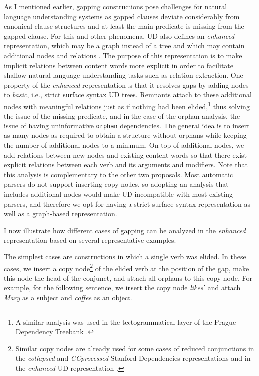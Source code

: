 \documentclass[lucida,biblatex]{sp} %
\begin{document}
As I mentioned earlier, gapping constructions pose challenges for natural language understanding systems as gapped clauses deviate considerably from canonical clause structures and at least the main predicate is missing from the gapped clause. For this and other phenomena, UD also defines an \textit{enhanced} representation, which may be a graph instead of a tree and which may contain additional 
nodes and relations \citep{Nivre2016,Schuster2016}. The purpose of this representation is to
 make implicit relations between content words more explicit in order to facilitate shallow natural language 
 understanding tasks such as relation extraction. One property of the \textit{enhanced} representation 
 is that it resolves gaps by adding nodes to \textit{basic}, i.e., strict surface syntax UD trees. Remnants attach to these additional
 nodes with meaningful relations just as if nothing had been elided,\footnote{A similar analysis was used in the tectogrammatical layer of the Prague Dependency Treebank \citep{PDT2013}.} thus solving the issue of the missing predicate, and in the case of the {\sc orphan} analysis, the issue of having uninformative \texttt{orphan} dependencies. The general idea is to insert 
 as many nodes as required to obtain a structure  without orphans while keeping the number 
 of additional nodes to a minimum. On top of additional nodes, we add relations between 
 new nodes and existing content words so that there exist explicit relations between each 
 verb and its arguments and modifiers. Note that this analysis is complementary to the other two proposals. Most automatic parsers do not support inserting copy nodes, so adopting an analysis that includes additional nodes would make UD incompatible with most existing parsers, and therefore we opt for having a strict surface syntax representation as well as a graph-based representation.
 
  
 I now illustrate how different cases of gapping 
 can be analyzed in the \textit{enhanced} representation based on several representative examples.

The simplest cases are constructions in which a single verb was elided. In these cases, we insert a copy node\footnote{Similar copy nodes are already used for some cases of reduced conjunctions in the \textit{collapsed} and \textit{CCprocessed} Stanford Dependencies representations \citep{DeMarneffe2008} and in the \textit{enhanced} UD representation \citep{Schuster2016}.} of the elided verb at the position of the gap, make this node the head of the conjunct, and attach all orphans to this copy node. For example, for the following sentence, we insert the copy node \textit{likes$'$} and attach \textit{Mary} as a subject and \textit{coffee} as an object.
\end{document}
